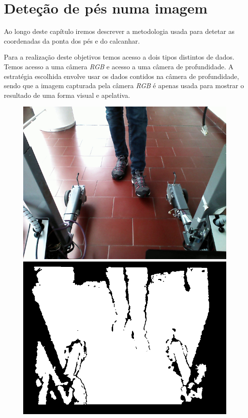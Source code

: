 \documentclass[a4paper]{report}
\begin{document}
\chapter{Deteção de pés numa imagem}
Ao longo deste capítulo iremos descrever a metodologia usada para detetar as
coordenadas da ponta dos pés e do calcanhar.

Para a realização deste objetivos temos acesso a dois tipos distintos de dados.
Temos acesso a uma câmera \textit{RGB} e acesso a uma câmera de profundidade. A estratégia
escolhida envolve usar os dados contidos na câmera de profundidade, sendo que a
imagem capturada pela câmera \textit{RGB} é apenas usada para mostrar o resultado de uma
forma visual e apelativa.

\begin{figure}[H]
\centering
\begin{minipage}{.5\textwidth}
  \centering
    \includegraphics[width=0.99\textwidth]{images/og/gait_RGB_oneimage.png}
\end{minipage}%
\begin{minipage}{.5\textwidth}
  \centering
    \includegraphics[width=0.99\textwidth]{images/og/gait_depth_oneimage.png}
\end{minipage}%
\end{figure}
\end{document}
